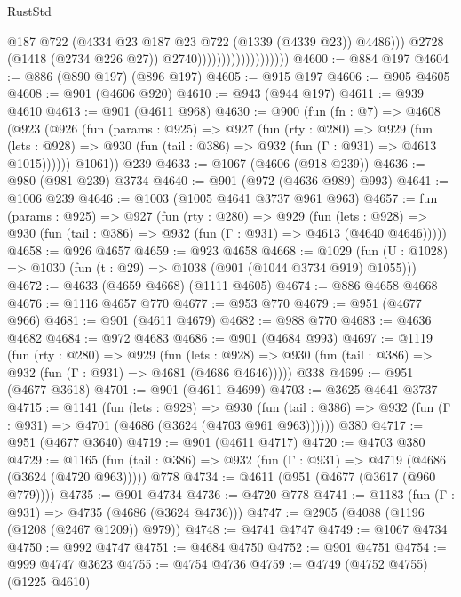 \begin{lexlean}{RustStd}
\begin{coremodule}
                                              @187
                                              @722
                                              (@4334 @23 @187 @23 @722 (@1339 (@4339 @23)) @4486)))
                                          @2728
                                          (@1418 (@2734 @226 @27))
                                          @2740)))))))))))))))))))
@4600 := @884 @197
@4604 := @886 (@890 @197) (@896 @197)
@4605 := @915 @197
@4606 := @905 @4605
@4608 := @901 (@4606 @920)
@4610 := @943 (@944 @197)
@4611 := @939 @4610
@4613 := @901 (@4611 @968)
@4630 := @900
    (fun (fn : @7) =>
    @4608
      (@923
        (@926
          (fun (params : @925) =>
          @927
            (fun (rty : @280) =>
            @929
              (fun (lets : @928) =>
              @930 (fun (tail : @386) => @932 (fun (Γ : @931) => @4613 @1015))))))
        @1061))
    @239
@4633 := @1067 (@4606 (@918 @239))
@4636 := @980 (@981 @239) @3734
@4640 := @901 (@972 (@4636 @989) @993)
@4641 := @1006 @239
@4646 := @1003 (@1005 @4641 @3737 @961 @963)
@4657 := fun (params : @925) =>
  @927
    (fun (rty : @280) =>
    @929
      (fun (lets : @928) =>
      @930 (fun (tail : @386) => @932 (fun (Γ : @931) => @4613 (@4640 @4646)))))
@4658 := @926 @4657
@4659 := @923 @4658
@4668 := @1029 (fun (U : @1028) => @1030 (fun (t : @29) => @1038 (@901 (@1044 @3734 @919) @1055)))
@4672 := @4633 (@4659 @4668) (@1111 @4605)
@4674 := @886 @4658 @4668
@4676 := @1116 @4657 @770
@4677 := @953 @770
@4679 := @951 (@4677 @966)
@4681 := @901 (@4611 @4679)
@4682 := @988 @770
@4683 := @4636 @4682
@4684 := @972 @4683
@4686 := @901 (@4684 @993)
@4697 := @1119
    (fun (rty : @280) =>
    @929
      (fun (lets : @928) =>
      @930 (fun (tail : @386) => @932 (fun (Γ : @931) => @4681 (@4686 @4646)))))
    @338
@4699 := @951 (@4677 @3618)
@4701 := @901 (@4611 @4699)
@4703 := @3625 @4641 @3737
@4715 := @1141
    (fun (lets : @928) =>
    @930 (fun (tail : @386) => @932 (fun (Γ : @931) => @4701 (@4686 (@3624 (@4703 @961 @963))))))
    @380
@4717 := @951 (@4677 @3640)
@4719 := @901 (@4611 @4717)
@4720 := @4703 @380
@4729 := @1165
    (fun (tail : @386) => @932 (fun (Γ : @931) => @4719 (@4686 (@3624 (@4720 @963)))))
    @778
@4734 := @4611 (@951 (@4677 (@3617 (@960 @779))))
@4735 := @901 @4734
@4736 := @4720 @778
@4741 := @1183 (fun (Γ : @931) => @4735 (@4686 (@3624 @4736)))
@4747 := @2905 (@4088 (@1196 (@1208 (@2467 @1209)) @979))
@4748 := @4741 @4747
@4749 := @1067 @4734
@4750 := @992 @4747
@4751 := @4684 @4750
@4752 := @901 @4751
@4754 := @999 @4747 @3623
@4755 := @4754 @4736
@4759 := @4749 (@4752 @4755) (@1225 @4610)

\end{coremodule}
\end{lexlean}
